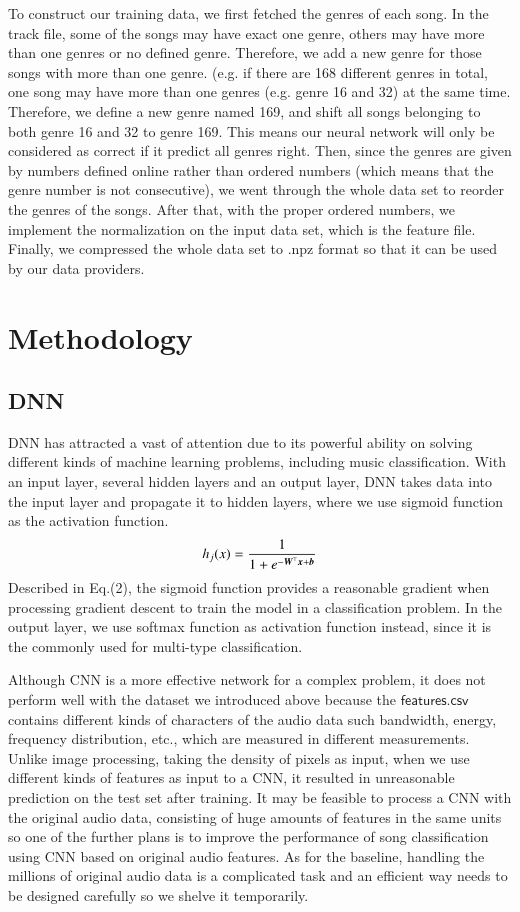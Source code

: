 \documentclass{article}
\def\mathbi#1{\textbf{\em #1}}
\begin{document}
To construct our training data, we first fetched the genres of each song. In the track file, some of the songs may have exact one genre, others may have more than one genres or no defined genre. Therefore, we add a new genre for those songs with more than one genre. (e.g. if there are 168 different genres in total, one song may have more than one genres (e.g. genre 16 and 32) at the same time. Therefore, we define a new genre named 169, and shift all songs belonging to both genre 16 and 32 to genre 169. This means our neural network will only be considered as correct if it predict all genres right. Then, since the genres are given by numbers defined online rather than ordered numbers (which means that the genre number is not consecutive), we went through the whole data set to reorder the genres of the songs. After that, with the proper ordered numbers, we implement the normalization on the input data set, which is the feature file. Finally, we compressed the whole data set to .npz format so that it can be used by our data providers.

\section{Methodology}
\subsection{DNN}
DNN has attracted a vast of attention due to its powerful ability on solving different kinds of machine learning problems, including music classification. With an input layer, several hidden layers and an output layer, DNN takes data into the input layer and propagate it to hidden layers, where we use sigmoid function as the activation function.
\begin{equation}
	h_ j (x) =  \frac{\mathrm{1} }{\mathrm{1} + e^{- \mathbi{W}^\top \mathbi{x} + \mathbi{b} }}
\end{equation}
Described in Eq.(2), the sigmoid function provides a reasonable gradient when processing gradient descent to train the model in a classification problem. In the output layer, we use softmax function as activation function instead, since it is the commonly used for multi-type classification. 

Although CNN is a more effective network for a complex problem, it does not perform well with the dataset we introduced above because the $\mathsf{features.csv}$ contains different kinds of characters of the audio data such bandwidth, energy, frequency distribution, etc., which are measured in different measurements. Unlike image processing, taking the density of pixels as input, when we use different kinds of features as input to a CNN, it resulted in unreasonable prediction on the test set after training. It may be feasible to process a CNN with the original audio data, consisting of huge amounts of features in the same units so one of the further plans is to improve the performance of song classification using CNN based on original audio features. As for the baseline, handling the millions of original audio data is a complicated task and an efficient way needs to be designed carefully so we shelve it temporarily. 
\end{document}
